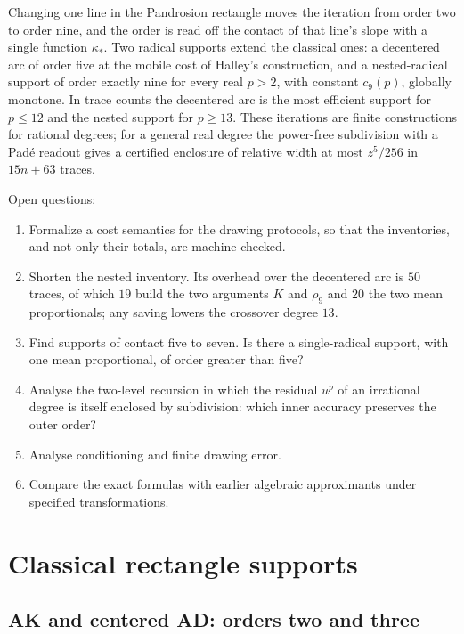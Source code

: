 Changing one line in the Pandrosion rectangle moves the iteration from order two to order nine, and the
order is read off the contact of that line's slope with a single function $\kappa_*$. Two radical
supports extend the classical ones: a decentered arc of order five at the mobile cost of Halley's
construction, and a nested-radical support of order exactly nine for every real $p>2$, with constant
$c_9(p)$, globally monotone. In trace counts the decentered arc is the most efficient support for
$p\le12$ and the nested support for $p\ge13$. These iterations are finite constructions for rational
degrees; for a general real degree the power-free subdivision with a Pad\'e readout gives a certified
enclosure of relative width at most $z^{5}/256$ in $15n+63$ traces.

Open questions:
\begin{enumerate}[label=\arabic*.]
\item Formalize a cost semantics for the drawing protocols, so that the inventories, and not only
  their totals, are machine-checked.
\item Shorten the nested inventory. Its overhead over the decentered arc is $50$ traces, of which $19$
  build the two arguments $K$ and $\rho_9$ and $20$ the two mean proportionals; any saving lowers the
  crossover degree $13$.
\item Find supports of contact five to seven. Is there a single-radical support, with one mean
  proportional, of order greater than five?
\item Analyse the two-level recursion in which the residual $u^{p}$ of an irrational degree is itself
  enclosed by subdivision: which inner accuracy preserves the outer order?
\item Analyse conditioning and finite drawing error.
\item Compare the exact formulas with earlier algebraic approximants under specified transformations.
\end{enumerate}

\FloatBarrier
\appendix
\section{Classical rectangle supports}\label{app:classical}

\subsection{AK and centered AD: orders two and three}


